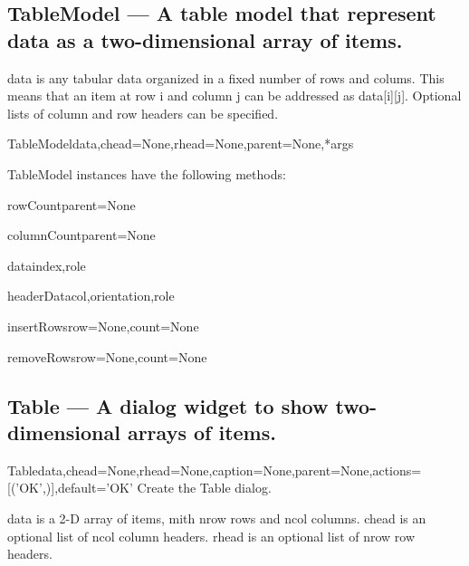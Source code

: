 \subsection{TableModel --- A table model that represent data as a two-dimensional array of items.}
    data is any tabular data organized in a fixed number of rows and colums.
    This means that an item at row i and column j can be addressed as
    data[i][j].
    Optional lists of column and row headers can be specified.
    

\begin{classdesc}{TableModel}{data,chead=None,rhead=None,parent=None,*args}

\end{classdesc}

TableModel instances have the following methods:

\begin{funcdesc}{rowCount}{parent=None}

\end{funcdesc}

\begin{funcdesc}{columnCount}{parent=None}

\end{funcdesc}

\begin{funcdesc}{data}{index,role}

\end{funcdesc}

\begin{funcdesc}{headerData}{col,orientation,role}

\end{funcdesc}

\begin{funcdesc}{insertRows}{row=None,count=None}

\end{funcdesc}

\begin{funcdesc}{removeRows}{row=None,count=None}

\end{funcdesc}

\subsection{Table --- A dialog widget to show two-dimensional arrays of items.}


\begin{classdesc}{Table}{data,chead=None,rhead=None,caption=None,parent=None,actions=[('OK',)],default='OK'}
Create the Table dialog.
        
        data is a 2-D array of items, mith nrow rows and ncol columns.
        chead is an optional list of ncol column headers.
        rhead is an optional list of nrow row headers.
        
\end{classdesc}

